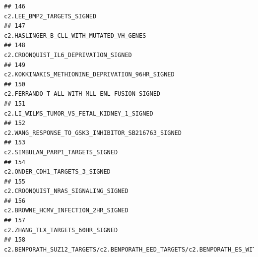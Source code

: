 \documentclass{article}\usepackage[]{graphicx}\usepackage[]{color}
\makeatletter
\newenvironment{kframe}{%
 \def\at@end@of@kframe{}%
 \ifinner\ifhmode%
  \def\at@end@of@kframe{\end{minipage}}%
  \begin{minipage}{\columnwidth}%
 \fi\fi%
 \def\FrameCommand##1{\hskip\@totalleftmargin \hskip-\fboxsep
 \colorbox{shadecolor}{##1}\hskip-\fboxsep
     \hskip-\linewidth \hskip-\@totalleftmargin \hskip\columnwidth}%
 \MakeFramed {\advance\hsize-\width
   \@totalleftmargin\z@ \linewidth\hsize
   \@setminipage}}%
 {\par\unskip\endMakeFramed%
 \at@end@of@kframe}
\newenvironment{knitrout}{}{} %
\makeatother
\begin{document}
\begin{knitrout}
\begin{kframe}
\begin{verbatim}
## 146                                                                                                                                                                                       c2.LEE_BMP2_TARGETS_SIGNED
## 147                                                                                                                                                                         c2.HASLINGER_B_CLL_WITH_MUTATED_VH_GENES
## 148                                                                                                                                                                             c2.CROONQUIST_IL6_DEPRIVATION_SIGNED
## 149                                                                                                                                                                 c2.KOKKINAKIS_METHIONINE_DEPRIVATION_96HR_SIGNED
## 150                                                                                                                                                                     c2.FERRANDO_T_ALL_WITH_MLL_ENL_FUSION_SIGNED
## 151                                                                                                                                                                       c2.LI_WILMS_TUMOR_VS_FETAL_KIDNEY_1_SIGNED
## 152                                                                                                                                                               c2.WANG_RESPONSE_TO_GSK3_INHIBITOR_SB216763_SIGNED
## 153                                                                                                                                                                                 c2.SIMBULAN_PARP1_TARGETS_SIGNED
## 154                                                                                                                                                                                   c2.ONDER_CDH1_TARGETS_3_SIGNED
## 155                                                                                                                                                                              c2.CROONQUIST_NRAS_SIGNALING_SIGNED
## 156                                                                                                                                                                              c2.BROWNE_HCMV_INFECTION_2HR_SIGNED
## 157                                                                                                                                                                                 c2.ZHANG_TLX_TARGETS_60HR_SIGNED
## 158                                                                                                      c2.BENPORATH_SUZ12_TARGETS/c2.BENPORATH_EED_TARGETS/c2.BENPORATH_ES_WITH_H3K27ME3/c2.BENPORATH_PRC2_TARGETS

\end{verbatim}
\end{kframe}
\end{knitrout}
\end{document}

